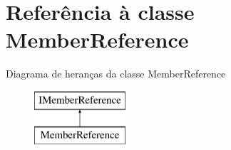 \hypertarget{class_member_reference}{\section{Referência à classe Member\-Reference}
\label{class_member_reference}
}
Diagrama de heranças da classe Member\-Reference\begin{figure}[H]
\begin{center}
\leavevmode
\includegraphics[height=2.000000cm]{class_member_reference}
\end{center}
\end{figure}
